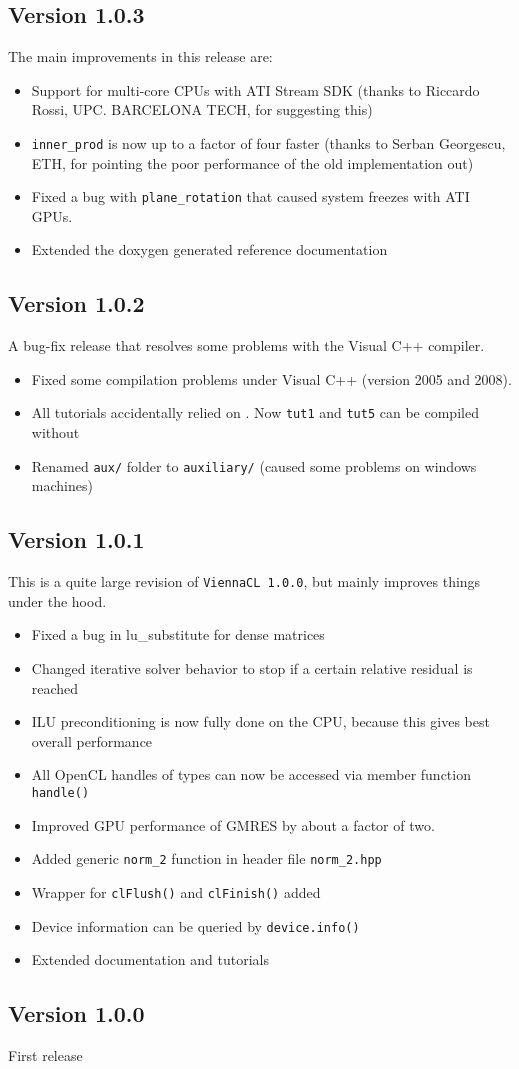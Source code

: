 \subsection*{Version 1.0.3}
The main improvements in this release are:
\begin{itemize}
 \item Support for multi-core CPUs with ATI Stream SDK (thanks to Riccardo Rossi, UPC. BARCELONA TECH, for suggesting this)
 \item \lstinline|inner_prod| is now up to a factor of four faster (thanks to Serban Georgescu, ETH, for pointing the poor performance of the old implementation out)
 \item Fixed a bug with \lstinline|plane_rotation| that caused system freezes with ATI GPUs.
 \item Extended the doxygen generated reference documentation
\end{itemize}

\subsection*{Version 1.0.2}
A bug-fix release that resolves some problems with the Visual C++ compiler.
\begin{itemize}
 \item Fixed some compilation problems under Visual C++ (version 2005 and 2008).
 \item All tutorials accidentally relied on {\ublas}. Now \texttt{tut1} and \texttt{tut5} can be compiled without {\ublas}
 \item Renamed \texttt{aux/} folder to \texttt{auxiliary/} (caused some problems on windows machines)
\end{itemize}

\subsection*{Version 1.0.1}
This is a quite large revision of \texttt{ViennaCL 1.0.0}, but mainly improves things under the hood.
\begin{itemize}
 \item Fixed a bug in lu\_substitute for dense matrices
 \item Changed iterative solver behavior to stop if a certain relative residual is reached
 \item ILU preconditioning is now fully done on the CPU, because this gives best overall performance
 \item All OpenCL handles of {\ViennaCL} types can now be accessed via member function \texttt{handle()}
 \item Improved GPU performance of GMRES by about a factor of two.
 \item Added generic \texttt{norm\_2} function in header file \texttt{norm\_2.hpp}
 \item Wrapper for \texttt{clFlush()} and \texttt{clFinish()} added
 \item Device information can be queried by \texttt{device.info()}
 \item Extended documentation and tutorials
\end{itemize}

\subsection*{Version 1.0.0}
First release
